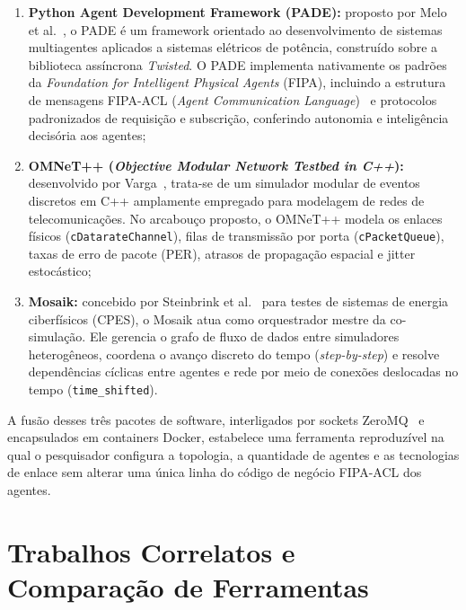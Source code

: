 \documentclass[10pt,twocolumn,a4paper]{article}
\begin{document}
\begin{enumerate}
    \item \textbf{Python Agent Development Framework (PADE):} proposto por Melo et al.~\cite{melo2019pade}, o PADE é um framework orientado ao desenvolvimento de sistemas multiagentes aplicados a sistemas elétricos de potência, construído sobre a biblioteca assíncrona \textit{Twisted}. O PADE implementa nativamente os padrões da \textit{Foundation for Intelligent Physical Agents} (FIPA), incluindo a estrutura de mensagens FIPA-ACL (\textit{Agent Communication Language})~\cite{fipa2002acl} e protocolos padronizados de requisição e subscrição, conferindo autonomia e inteligência decisória aos agentes;
    \item \textbf{OMNeT++ (\textit{Objective Modular Network Testbed in C++}):} desenvolvido por Varga~\cite{varga2010omnetpp}, trata-se de um simulador modular de eventos discretos em C++ amplamente empregado para modelagem de redes de telecomunicações. No arcabouço proposto, o OMNeT++ modela os enlaces físicos (\texttt{cDatarateChannel}), filas de transmissão por porta (\texttt{cPacketQueue}), taxas de erro de pacote (PER), atrasos de propagação espacial e jitter estocástico;
    \item \textbf{Mosaik:} concebido por Steinbrink et al.~\cite{steinbrink2019mosaik} para testes de sistemas de energia ciberfísicos (CPES), o Mosaik atua como orquestrador mestre da co-simulação. Ele gerencia o grafo de fluxo de dados entre simuladores heterogêneos, coordena o avanço discreto do tempo (\textit{step-by-step}) e resolve dependências cíclicas entre agentes e rede por meio de conexões deslocadas no tempo (\texttt{time\_shifted}).
\end{enumerate}

A fusão desses três pacotes de software, interligados por sockets ZeroMQ~\cite{hintjens2013zeromq} e encapsulados em containers Docker, estabelece uma ferramenta reproduzível na qual o pesquisador configura a topologia, a quantidade de agentes e as tecnologias de enlace sem alterar uma única linha do código de negócio FIPA-ACL dos agentes.

\section{Trabalhos Correlatos e Comparação de Ferramentas}
\end{document}
